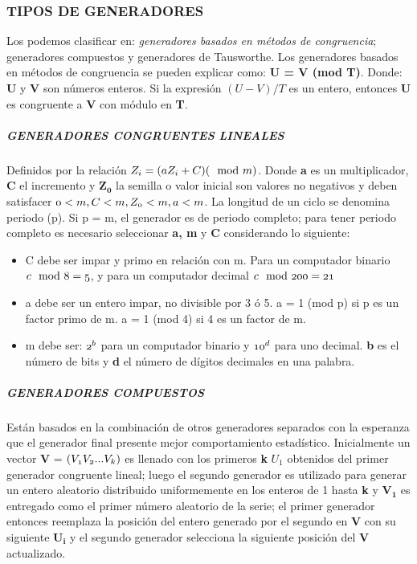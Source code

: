 	 \subsubsection*{TIPOS DE GENERADORES}
	 \noindent Los podemos clasificar en: \textit{generadores basados en métodos de congruencia}; generadores compuestos y generadores de Tausworthe. Los generadores basados en métodos de congruencia se pueden explicar como: \textbf{U = V (mod T)}. Donde: \textbf{U} y \textbf{V} son números enteros. Si la expresión $(U - V)/T$ es un entero, entonces \textbf{U} es congruente a \textbf{V} con módulo en \textbf{T}. 
	 
	 \subparagraph*{GENERADORES CONGRUENTES LINEALES}
	 \noindent Definidos por la relación $\mathnormal{Z_i = (a Z_i + C)(\mod m)}$. Donde \textbf{a} es un multiplicador, \textbf{C} el incremento y $\mathbf{Z_0}$ la semilla o valor inicial son valores no negativos y deben satisfacer $\mathnormal{0 < m,C < m, Z_0 < m, a < m}$.
	 La longitud de un ciclo se denomina periodo (p). Si p = m, el generador es de periodo completo; para tener periodo completo es necesario seleccionar \textbf{a, m} y \textbf{C} considerando lo siguiente:
	 \begin{itemize}
	 	\item C debe ser impar y primo en relación con m. Para un computador binario $\mathnormal{c \mod 8 = 5}$, y para un computador decimal $\mathnormal{c\mod 200 = 21}$
	 	\item a debe ser un entero impar, no divisible por 3 ó 5. a = 1 (mod p) si p es un factor primo de m. a = 1 (mod 4) si 4 es un factor de m.
	 	\item m debe ser: $\mathnormal{2^b}$ para un computador binario y $\mathnormal{10^d}$ para uno decimal. \textbf{b} es el número de bits y \textbf{d} el número de dígitos decimales en una palabra. 
	 \end{itemize}
 
 	\subparagraph*{GENERADORES COMPUESTOS}
 	\noindent Están basados en la combinación de otros generadores separados con la esperanza que el generador final presente mejor comportamiento estadístico. Inicialmente un vector \textbf{V} = $\mathnormal{(V_1V_2...V_k)}$ es llenado con los primeros \textbf{k} $U_1$ obtenidos del primer generador congruente lineal; luego el segundo generador es utilizado para generar un entero aleatorio distribuido uniformemente en los enteros de 1 hasta \textbf{k} y $\mathbf{V_1}$ es entregado como el primer número aleatorio de la serie; el primer generador entonces reemplaza la posición del entero generado por el segundo en \textbf{V} con su siguiente $\mathbf{U_i}$ y el segundo generador selecciona la siguiente posición del \textbf{V} actualizado. 
 	
